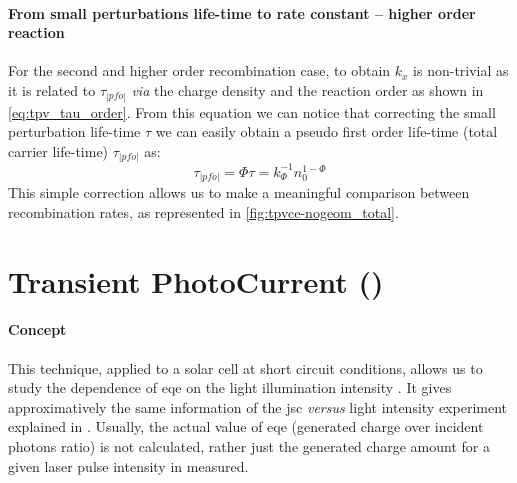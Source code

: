 \paragraph{From small perturbations life-time to rate constant -- higher order reaction}
For the second and higher order recombination case, to obtain $k_x$ is non-trivial as it is related to $\tau_|pfo|$ \textit{via} the charge density \cite{ORegan2007} and the reaction order \cite{Shuttle2008,Du2018} as shown in \cref{eq:tpv_tau_order}.
From this equation we can notice that correcting the small perturbation life-time $\tau$ we can easily obtain a pseudo first order life-time (total carrier life-time) $\tau_|pfo|$ as:
$$\tau_|pfo| = \Phi \tau = k_\Phi^{-1} n_0^{1-\Phi}$$
This simple correction allows us to make a meaningful comparison between recombination rates, as represented in \cref{fig:tpvce-nogeom_total}.

\section{Transient PhotoCurrent ()}\label{characterization_tpc}

	\paragraph{Concept}
	This technique, applied to a solar cell at short circuit conditions, allows us to study the dependence of \gls{eqe} on the light illumination intensity \cite{ORegan2004}.
	It gives approximatively the same information of the \gls{jsc} \textit{versus} light intensity experiment explained in .
	Usually, the actual value of \gls{eqe} (generated charge over incident photons ratio) is not calculated, rather just the generated charge amount for a given laser pulse intensity in measured.

